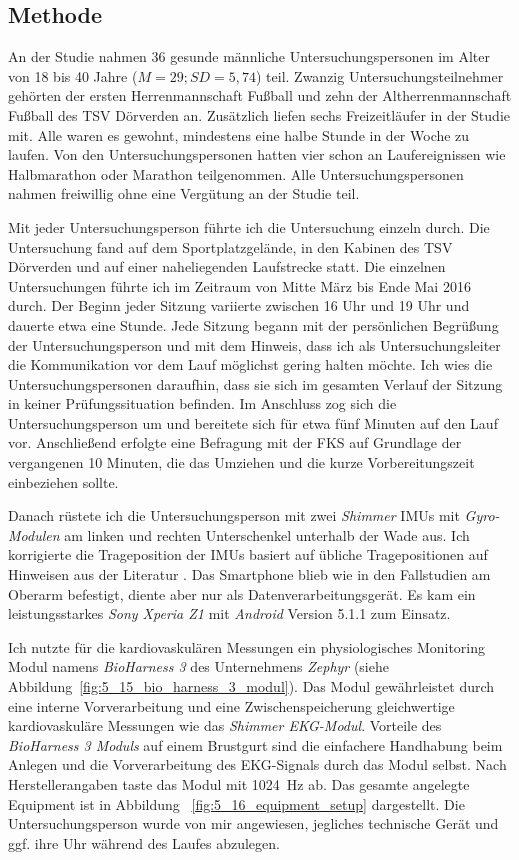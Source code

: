 \subsection{Methode}
An der Studie nahmen 36 gesunde männliche Untersuchungspersonen im Alter von 18 bis 40 Jahre ($M = 29; SD = 5{,}74$) teil. Zwanzig Untersuchungsteilnehmer gehörten der ersten Herrenmannschaft Fußball und zehn der Altherrenmannschaft Fußball des TSV Dörverden an. Zusätzlich liefen sechs Freizeitläufer in der Studie mit. Alle waren es gewohnt, mindestens eine halbe Stunde in der Woche zu laufen. Von den Untersuchungspersonen hatten vier schon an Laufereignissen wie Halbmarathon oder Marathon teilgenommen. Alle Untersuchungspersonen nahmen freiwillig ohne eine Vergütung an der Studie teil. 

Mit jeder Untersuchungsperson führte ich die Untersuchung einzeln durch. Die Untersuchung fand auf dem Sportplatzgelände, in den Kabinen des TSV Dörverden und auf einer naheliegenden Laufstrecke statt. Die einzelnen Untersuchungen führte ich im Zeitraum von Mitte März bis Ende Mai 2016 durch. Der Beginn jeder Sitzung variierte zwischen 16 Uhr und 19 Uhr und dauerte etwa eine Stunde. Jede Sitzung begann mit der persönlichen Begrüßung der Untersuchungsperson und mit dem Hinweis, dass ich als Untersuchungsleiter die Kommunikation vor dem Lauf möglichst gering halten möchte. Ich wies die Untersuchungspersonen daraufhin, dass sie sich im gesamten Verlauf der Sitzung in keiner Prüfungssituation befinden. Im Anschluss zog sich die Untersuchungsperson um und bereitete sich für etwa fünf Minuten auf den Lauf vor. Anschließend erfolgte eine Befragung mit der \ac{FKS} auf Grundlage der vergangenen 10 Minuten, die das Umziehen und die kurze Vorbereitungszeit einbeziehen sollte. 

Danach rüstete ich die Untersuchungsperson mit zwei \emph{Shimmer} \acp{IMU} mit \emph{Gyro-Modulen} am linken und rechten Unterschenkel unterhalb der Wade aus. Ich korrigierte die Trageposition der \acp{IMU} basiert auf übliche Tragepositionen auf Hinweisen aus der Literatur \citep[vgl.][]{Hreljac1993}. Das Smartphone blieb wie in den Fallstudien am Oberarm befestigt, diente aber nur als Datenverarbeitungsgerät. Es kam ein leistungsstarkes \emph{Sony Xperia Z1} mit \emph{Android} Version 5.1.1 zum Einsatz.

Ich nutzte für die kardiovaskulären Messungen ein physiologisches Monitoring Modul namens \emph{BioHarness 3} des Unternehmens \emph{Zephyr} (siehe Abbildung~\ref{fig:5_15_bio_harness_3_modul}). Das Modul gewährleistet durch eine interne Vorverarbeitung und eine Zwischenspeicherung gleichwertige kardiovaskuläre Messungen wie das \emph{Shimmer EKG-Modul}. Vorteile des \emph{BioHarness 3 Moduls} auf einem Brustgurt sind die einfachere Handhabung beim Anlegen und die Vorverarbeitung des \ac{EKG}-Signals durch das Modul selbst. Nach Herstellerangaben taste das Modul mit 1024~Hz ab. Das gesamte angelegte Equipment ist in Abbildung ~\ref{fig:5_16_equipment_setup} dargestellt. Die Untersuchungsperson wurde von mir angewiesen, jegliches technische Gerät und ggf. ihre Uhr während des Laufes abzulegen.

